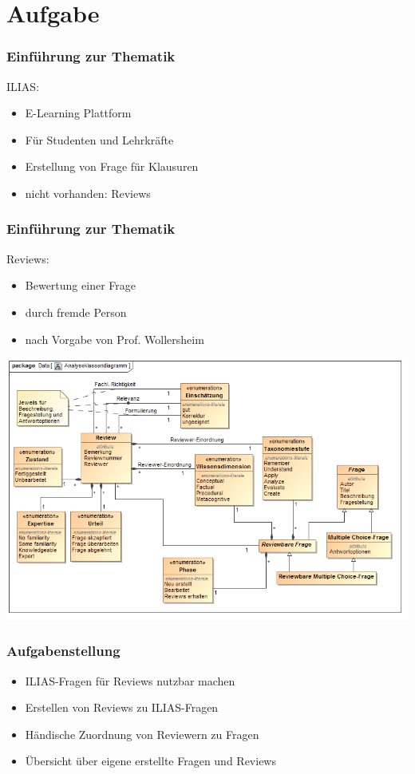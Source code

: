 \documentclass{beamer}
\begin{document}
	\section{Aufgabe}
		\begin{frame}
			\frametitle{Einführung zur Thematik}
			ILIAS:
			\begin{itemize}
  				\item E-Learning Plattform
  				\item Für Studenten und Lehrkräfte
  				\pause
  			 	\item Erstellung von Frage für Klausuren
  				\pause
    			\item nicht vorhanden: Reviews
    		\end{itemize}
		\end{frame}
		\begin{frame}
			\frametitle{Einführung zur Thematik}
			Reviews:
			\begin{itemize}
				\item Bewertung einer Frage
				\pause
				\item durch fremde Person
				\pause				
				\item nach Vorgabe von Prof. Wollersheim
			\end{itemize}
		\end{frame}
		\begin{frame}
			\begin{center}
				\includegraphics[scale=0.4]{Diagramme/Class_Diagram__Analyseklassendiagramm.png}
				\label{Analyseklassendiagramm}
			\end{center}
		\end{frame}
		\begin{frame}
			\frametitle{Aufgabenstellung}
			\begin{itemize}
				\item ILIAS-Fragen für Reviews nutzbar machen
				\pause
				\item Erstellen von Reviews zu ILIAS-Fragen
				\pause
				\item Händische Zuordnung von Reviewern zu Fragen
				\pause
				\item Übersicht über eigene erstellte Fragen und Reviews
			\end{itemize}
		\end{frame}
\end{document}
